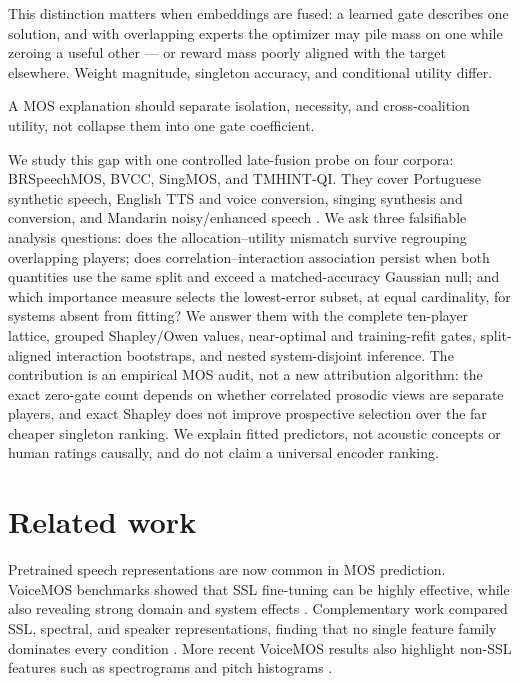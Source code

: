 \documentclass{article}
\begin{document}
This distinction matters when embeddings are fused: a learned gate describes
one solution, and with overlapping experts the optimizer may pile mass on one
while zeroing a useful other --- or reward mass poorly aligned with the target
elsewhere. Weight magnitude, singleton accuracy, and conditional utility differ.

A MOS explanation should separate isolation, necessity, and cross-coalition
utility, not collapse them into one gate coefficient.

We study this gap with one controlled late-fusion probe on four corpora:
BRSpeechMOS, BVCC, SingMOS, and TMHINT-QI. They cover Portuguese
synthetic speech, English TTS and voice conversion, singing synthesis and
conversion, and Mandarin noisy/enhanced speech
\cite{oliveira2023representations,huang2022voicemos,huang2024voicemos,cooper2023voicemos}.
We ask three falsifiable analysis questions: does the allocation--utility
mismatch survive regrouping overlapping players; does correlation--interaction
association persist when both quantities use the same split and exceed a
matched-accuracy Gaussian null; and which importance measure selects the
lowest-error subset, at equal cardinality, for systems absent from fitting? We answer them with the complete
ten-player lattice, grouped Shapley/Owen values, near-optimal and training-refit
gates, split-aligned interaction bootstraps, and nested system-disjoint inference. The
contribution is an empirical MOS audit, not a new attribution algorithm: the
exact zero-gate count depends on whether correlated prosodic views are separate
players, and exact Shapley does not improve prospective selection over the far
cheaper singleton ranking. We explain fitted predictors, not acoustic concepts
or human ratings causally, and do not claim a universal encoder ranking.

\section{Related work}
\label{sec:related}

Pretrained speech representations are now common in MOS prediction. VoiceMOS
benchmarks showed that SSL fine-tuning can be highly effective, while also
revealing strong domain and system effects \cite{huang2022voicemos,cooper2023voicemos}.
Complementary work compared SSL, spectral, and speaker
representations, finding that no single feature family dominates every
condition \cite{oliveira2023representations}. More
recent VoiceMOS results also highlight non-SSL features such as spectrograms
and pitch histograms \cite{huang2024voicemos}.
\end{document}
